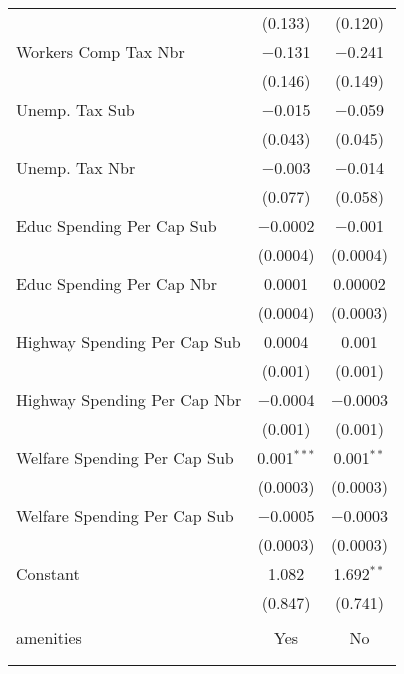 \begin{table}[!htbp]
\begin{tabular}{@{\extracolsep{5pt}}lcc}
  & (0.133) & (0.120) \\ 
  Workers Comp Tax Nbr & $-$0.131 & $-$0.241 \\ 
  & (0.146) & (0.149) \\ 
  Unemp. Tax Sub & $-$0.015 & $-$0.059 \\ 
  & (0.043) & (0.045) \\ 
  Unemp. Tax Nbr & $-$0.003 & $-$0.014 \\ 
  & (0.077) & (0.058) \\ 
  Educ Spending Per Cap Sub & $-$0.0002 & $-$0.001 \\ 
  & (0.0004) & (0.0004) \\ 
  Educ Spending Per Cap Nbr & 0.0001 & 0.00002 \\ 
  & (0.0004) & (0.0003) \\ 
  Highway Spending Per Cap Sub & 0.0004 & 0.001 \\ 
  & (0.001) & (0.001) \\ 
  Highway Spending Per Cap Nbr & $-$0.0004 & $-$0.0003 \\ 
  & (0.001) & (0.001) \\ 
  Welfare Spending Per Cap Sub & 0.001$^{***}$ & 0.001$^{**}$ \\ 
  & (0.0003) & (0.0003) \\ 
  Welfare Spending Per Cap Sub & $-$0.0005 & $-$0.0003 \\ 
  & (0.0003) & (0.0003) \\ 
  Constant & 1.082 & 1.692$^{**}$ \\ 
  & (0.847) & (0.741) \\ 
 \hline \\[-1.8ex] 
amenities & Yes & No \\ 
\hline \\[-1.8ex] 
\hline 
\hline \\[-1.8ex] 
\end{tabular} 
\end{table} 
